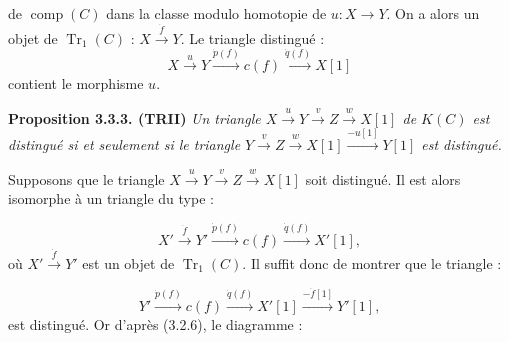 \clearpage
{}%
\begingroup
\setlength{\abovedisplayskip}{3pt plus 2pt minus 2pt}%
\setlength{\belowdisplayskip}{3pt plus 2pt minus 2pt}%
de $\operatorname{comp}(C)$ dans la classe modulo homotopie de
$u\colon X\to Y$.
On a alors un objet de $\operatorname{Tr}_1(C)$ :
$X\xrightarrow{\dot f}Y$.
Le triangle distingué :
\begin{equation*}
  X\xrightarrow{u}Y\xrightarrow{\dot p(f)}c(f)
  \xrightarrow{\dot q(f)}X[1]
\end{equation*}
contient le morphisme $u$.

\noindent\textbf{Proposition 3.3.3. (TRII)}\quad
{}
\textit{Un triangle
$X\xrightarrow{u}Y\xrightarrow{v}Z\xrightarrow{w}X[1]$ de $K(C)$ est
distingué si et seulement si le triangle
$Y\xrightarrow{v}Z\xrightarrow{w}X[1]\xrightarrow{-u[1]}Y[1]$ est
distingué.}

Supposons que le triangle
$X\xrightarrow{u}Y\xrightarrow{v}Z\xrightarrow{w}X[1]$ soit distingué.
Il est alors isomorphe à un triangle du type :

\begin{equation*}
  X'\xrightarrow{\dot f}Y'\xrightarrow{\dot p(f)}c(f)
  \xrightarrow{\dot q(f)}X'[1],
\end{equation*}
où $X'\xrightarrow{\dot f}Y'$ est un objet de $\operatorname{Tr}_1(C)$.
Il suffit donc de montrer que le triangle :

\begin{equation*}
  Y'\xrightarrow{\dot p(f)}c(f)\xrightarrow{\dot q(f)}X'[1]
  \xrightarrow{-\dot f[1]}Y'[1],
\end{equation*}
est distingué. Or d'après (3.2.6), le diagramme :


